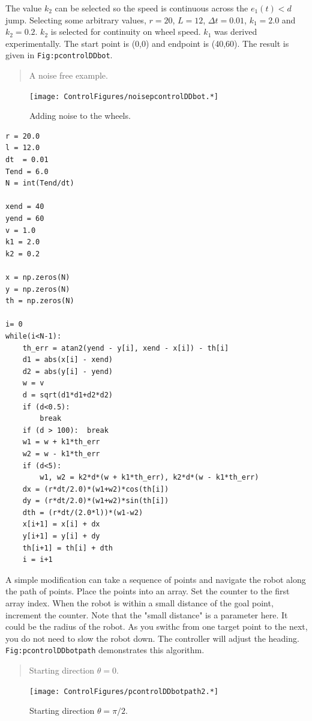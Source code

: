 The value \(k_2\) can be selected so the speed is continuous across the
\(e_1(t) < d\) jump. Selecting some arbitrary values, \(r=20\),
\(L=12\), \(\Delta t =0.01\), \(k_1=2.0\) and \(k_2=0.2\). \(k_2\) is
selected for continuity on wheel speed. \(k_1\) was derived
experimentally. The start point is (0,0) and endpoint is (40,60). The
result is given in \texttt{Fig:pcontrolDDbot}.

\begin{quote}
A noise free example.
\end{quote}

\begin{figure}
\centering
\texttt{[image: ControlFigures/noisepcontrolDDbot.*]}
\caption{Adding noise to the wheels.}
\end{figure}

\begin{verbatim}
r = 20.0
l = 12.0
dt  = 0.01
Tend = 6.0
N = int(Tend/dt)

xend = 40
yend = 60
v = 1.0
k1 = 2.0
k2 = 0.2

x = np.zeros(N)
y = np.zeros(N)
th = np.zeros(N)

i= 0
while(i<N-1):
    th_err = atan2(yend - y[i], xend - x[i]) - th[i]
    d1 = abs(x[i] - xend)
    d2 = abs(y[i] - yend)
    w = v
    d = sqrt(d1*d1+d2*d2)
    if (d<0.5):
        break
    if (d > 100):  break
    w1 = w + k1*th_err
    w2 = w - k1*th_err
    if (d<5):
        w1, w2 = k2*d*(w + k1*th_err), k2*d*(w - k1*th_err)
    dx = (r*dt/2.0)*(w1+w2)*cos(th[i])
    dy = (r*dt/2.0)*(w1+w2)*sin(th[i])
    dth = (r*dt/(2.0*l))*(w1-w2)
    x[i+1] = x[i] + dx
    y[i+1] = y[i] + dy
    th[i+1] = th[i] + dth
    i = i+1
\end{verbatim}

A simple modification can take a sequence of points and navigate the
robot along the path of points. Place the points into an array. Set the
counter to the first array index. When the robot is within a small
distance of the goal point, increment the counter. Note that the "small
distance" is a parameter here. It could be the radius of the robot. As
you swithc from one target point to the next, you do not need to slow
the robot down. The controller will adjust the heading.
\texttt{Fig:pcontrolDDbotpath} demonstrates this algorithm.

\begin{quote}
Starting direction \(\theta =0\).
\end{quote}

\begin{figure}
\centering
\texttt{[image: ControlFigures/pcontrolDDbotpath2.*]}
\caption{Starting direction \(\theta = \pi /2\).}
\end{figure}

